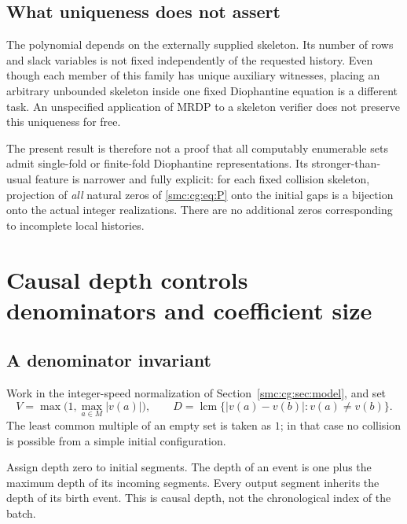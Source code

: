 \documentclass[11pt,letterpaper]{article}
\numberwithin{equation}{section}
\theoremstyle{definition}
\theoremstyle{remark}
\newcommand{\lcm}{\operatorname{lcm}}
\begin{document}
\subsection{What uniqueness does not assert}

The polynomial depends on the externally supplied skeleton. Its number of
rows and slack variables is not fixed independently of the requested
history. Even though each member of this family has unique auxiliary
witnesses, placing an arbitrary unbounded skeleton inside one fixed
Diophantine equation is a different task. An unspecified application of
MRDP to a skeleton verifier does not preserve this uniqueness for free.

The present result is therefore not a proof that all computably enumerable
sets admit single-fold or finite-fold Diophantine representations. Its
stronger-than-usual feature is narrower and fully explicit: for each fixed
collision skeleton, projection of \emph{all} natural zeros of \eqref{smc:cg:eq:P}
onto the initial gaps is a bijection onto the actual integer realizations.
There are no additional zeros corresponding to incomplete local histories.

\section{Causal depth controls denominators and coefficient size}
\label{smc:cg:sec:depth}

\subsection{A denominator invariant}

Work in the integer-speed normalization of Section~\ref{smc:cg:sec:model}, and set
\begin{equation}
 V=\max\bigl(1,\max_{a\in M}|v(a)|\bigr),\qquad
 D=\lcm\{|v(a)-v(b)|:v(a)\ne v(b)\}.
 \label{smc:cg:eq:VD}
\end{equation}
The least common multiple of an empty set is taken as $1$; in that case no
collision is possible from a simple initial configuration.

Assign depth zero to initial segments. The depth of an event is one plus
the maximum depth of its incoming segments. Every output segment inherits
the depth of its birth event. This is causal depth, not the chronological
index of the batch.
\end{document}

